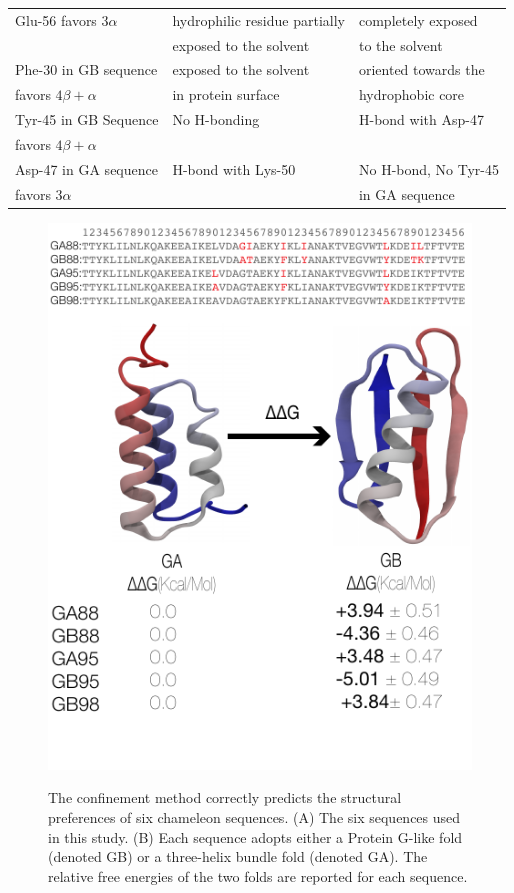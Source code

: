 \documentclass[12pt]{article}
\begin{document}
\begin{table}
\begin{center}
\begin{tabular}{| l | l | l |}
    Glu-56 favors $3 \alpha$                   & hydrophilic residue partially  & completely exposed                                    \\
                                               & exposed to the solvent         & to the solvent                                        \\ \hline
    Phe-30 in GB sequence                      & exposed to the solvent         & oriented towards the                                  \\
    favors $4 \beta + \alpha$                  & in protein surface             & hydrophobic core                                      \\ \hline   
    Tyr-45 in GB Sequence                      & No H-bonding                   & H-bond with Asp-47                                    \\  
    favors $4 \beta + \alpha$                  &                                &                                                       \\ \hline
    Asp-47 in GA sequence                      & H-bond with Lys-50             & No H-bond, No Tyr-45                                  \\  
    favors $3 \alpha$                                 &                         & in GA sequence                                         \\ \hline
\end{tabular}
\end{center}
\end{table}


\begin{figure}
\includegraphics[width=3.5 in,height=4 in]{orban.pdf}
\label{fig:orban}
\caption{The confinement method correctly predicts the structural preferences of six chameleon
sequences. (A) The six sequences used in this study. (B) Each sequence adopts either a Protein
G-like fold (denoted GB) or a three-helix bundle fold (denoted GA). The relative free energies of
the two folds are reported for each sequence.}
\end{figure}
\end{document}
